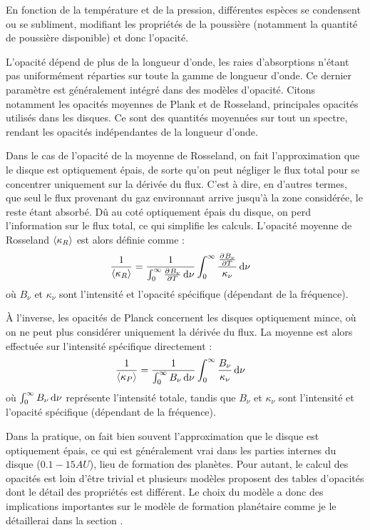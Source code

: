 En fonction de la température et de la pression, différentes espèces se condensent ou se subliment, modifiant les propriétés de la poussière (notamment la quantité de poussière disponible) et donc l'opacité.

L'opacité dépend de plus de la longueur d'onde, les raies d'absorptions n'étant pas uniformément réparties sur toute la gamme de longueur d'onde. Ce dernier paramètre est généralement intégré dans des modèles d'opacité. Citons notamment les opacités moyennes de Plank et de Rosseland, principales opacités utilisés dans les disques. Ce sont des quantités moyennées sur tout un spectre, rendant les opacités indépendantes de la longueur d'onde. 

Dans le cas de l'opacité de la moyenne de Rosseland, on fait l'approximation que le disque est optiquement épais, de sorte qu'on peut négliger le flux total pour se concentrer uniquement sur la dérivée du flux. C'est à dire, en d'autres termes, que seul le flux provenant du gaz environnant arrive jusqu'à la zone considérée, le reste étant absorbé. Dû au coté optiquement épais du disque, on perd l'information sur le flux total, ce qui simplifie les calculs. L'opacité moyenne de Rosseland $\left\langle \kappa_R\right\rangle$ est alors définie comme : 
\begin{align}
\inv{\moy{\kappa_R}} &= \inv{\int_0^\infty \pd{B_\nu}{T}\dif \nu} \int_0^\infty \frac{\pd{B_\nu}{T}}{\kappa_\nu}\dif \nu
\end{align}
où $B_\nu$ et $\kappa_\nu$ sont l'intensité et l'opacité spécifique (dépendant de la fréquence).

À l'inverse, les opacités de Planck concernent les disques optiquement mince, où on ne peut plus considérer uniquement la dérivée du flux. La moyenne est alors effectuée sur l'intensité spécifique directement : 
\begin{align}
\frac{1}{\left\langle \kappa_P\right\rangle} &= \frac{1}{\int_0^\infty B_\nu\operatorname{d \!} \nu} \int_0^\infty \frac{B_\nu}{\kappa_\nu}\operatorname{d \!} \nu
\end{align}
où $\int_0^\infty B_\nu\operatorname{d \!} \nu$ représente l'intensité totale, tandis que $B_\nu$ et $\kappa_\nu$ sont l'intensité et l'opacité spécifique (dépendant de la fréquence).

Dans la pratique, on fait bien souvent l'approximation que le disque est optiquement épais, ce qui est généralement vrai dans les parties internes du disque ($0.1-15\unit{AU}$), lieu de formation des planètes. Pour autant, le calcul des opacités est loin d'être trivial et plusieurs modèles proposent des tables d'opacités dont le détail des propriétés est différent. Le choix du modèle a donc des implications importantes sur le modèle de formation planétaire comme je le détaillerai dans la section . 

